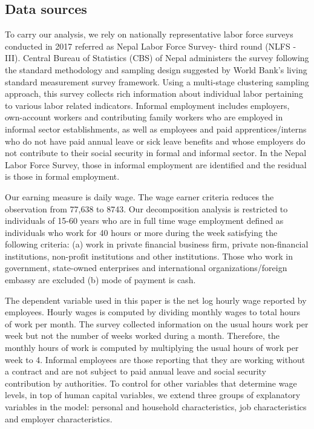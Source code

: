 \subsection{Data sources}
To carry our analysis, we rely on nationally representative labor force surveys conducted in 2017 referred as Nepal Labor Force Survey- third round (NLFS -III). Central Bureau of Statistics (CBS) of Nepal administers the survey following the standard methodology and sampling design suggested by World Bank's living standard measurement survey framework. Using a multi-stage clustering sampling approach, this survey collects rich information about individual labor pertaining to various labor related indicators. Informal employment includes employers, own-account workers and contributing family workers who are employed in informal sector establishments, as well as employees and paid apprentices/interns who do not have paid annual leave or sick leave benefits and whose employers do not contribute to their social security in formal and informal sector. In the Nepal Labor Force Survey, those in informal employment are identified and the residual is those in formal employment. \par

Our earning measure is daily wage. The wage earner criteria reduces the observation from 77,638 to 8743. Our decomposition analysis is restricted to individuals of 15-60 years who are in full time wage employment deﬁned as individuals who work for 40 hours or more during the week satisfying the following criteria: 
(a) work in private financial business firm, private non-financial institutions, non-profit institutions and other institutions. Those who work in government, state-owned enterprises and international organizations/foreign embassy are excluded
(b) mode of payment is cash.

The dependent variable used in this paper is the net log hourly wage reported by employees. Hourly wages is computed by dividing monthly wages to  total hours of work per month. The survey collected information on the usual hours work per week but not the number of weeks worked during a month. Therefore, the monthly hours of work is computed by multiplying the usual hours of work per week to 4. Informal employees are those reporting that they are working without a contract and are not subject to paid annual leave and social security contribution by authorities. To control for other variables that determine wage levels, in top of human capital variables, we extend three groups of explanatory variables in the model: personal and household characteristics, job characteristics and employer characteristics. \par

